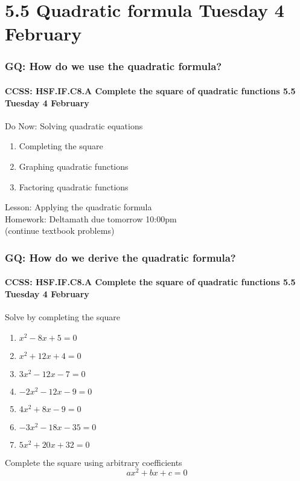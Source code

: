\documentclass{beamer}
\begin{document}
\section{5.5 Quadratic formula \hfill Tuesday 4 February}
\frame
{
  \frametitle{GQ: How do we use the quadratic formula?}
  \framesubtitle{CCSS: HSF.IF.C8.A Complete the square of quadratic functions \hfill \alert{5.5 Tuesday 4 February}}

  \begin{block}{Do Now: Solving quadratic equations}
    \begin{enumerate}
      \item Completing the square
      \item Graphing quadratic functions
      \item Factoring quadratic functions
    \end{enumerate}
    \end{block}
    Lesson: Applying the quadratic formula\\ \smallskip
    Homework: Deltamath due tomorrow 10:00pm \\ \quad (continue textbook problems)
    }
  
  \frame
  {
    \frametitle{GQ: How do we derive the quadratic formula?}
    \framesubtitle{CCSS: HSF.IF.C8.A Complete the square of quadratic functions \hfill \alert{5.5 Tuesday 4 February}}
  
    \begin{block}{Solve by completing the square}
      \begin{enumerate}
        \item $x^2-8x+5=0$
        \item $x^2+12x+4=0$
        \item $3x^2-12x-7=0$
        \item $-2x^2-12x-9=0$
        \item $4x^2+8x-9=0$
        \item $-3x^2-18x-35=0$
        \item $5x^2+20x+32=0$
      \end{enumerate}
      \end{block}
      Complete the square using arbitrary coefficients
      \[ax^2+bx+c=0\]
      }
\end{document}
